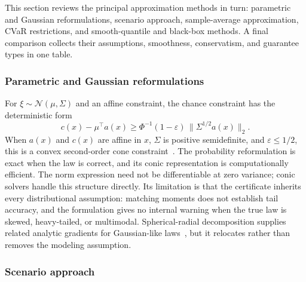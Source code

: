 This section reviews the principal approximation methods in turn: parametric and Gaussian reformulations, scenario approach, sample-average approximation, CVaR restrictions, and smooth-quantile and black-box methods. A final comparison collects their assumptions, smoothness, conservatism, and guarantee types in one table.

\subsubsection{Parametric and Gaussian reformulations}
\label{ssec:gaussian}

For $\xi\sim\mathcal N(\mu,\Sigma)$ and an affine constraint, the chance constraint has the deterministic form
\begin{equation}
 c(x)-\mu^\top a(x)\geq\Phi^{-1}(1-\varepsilon)\,\|\Sigma^{1/2}a(x)\|_2.
 \label{eq:ch2-soc}
\end{equation}
When $a(x)$ and $c(x)$ are affine in $x$, $\Sigma$ is positive semidefinite, and $\varepsilon\leq1/2$, this is a convex second-order cone constraint~\citep{charnes1963,shapiro2014}. The probability reformulation is exact when the law is correct, and its conic representation is computationally efficient. The norm expression need not be differentiable at zero variance; conic solvers handle this structure directly. Its limitation is that the certificate inherits every distributional assumption: matching moments does not establish tail accuracy, and the formulation gives no internal warning when the true law is skewed, heavy-tailed, or multimodal. Spherical-radial decomposition supplies related analytic gradients for Gaussian-like laws~\citep{vanackooij2014}, but it relocates rather than removes the modeling assumption.

\subsubsection{Scenario approach}
\label{ssec:scenario}

